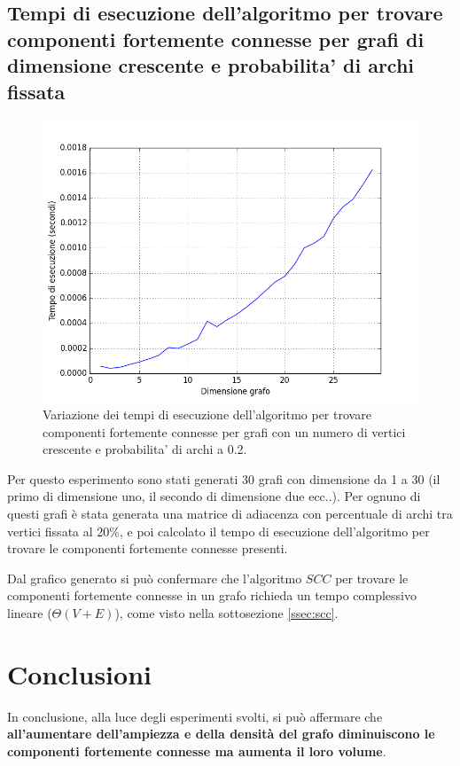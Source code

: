 \documentclass[a4paper,12pt]{article}
\begin{document}
\clearpage
\subsection{Tempi di esecuzione dell'algoritmo per trovare componenti fortemente connesse per grafi di dimensione crescente e probabilita' di archi fissata}
\begin{figure}[h]
    \centering
    \captionsetup{justification=centering,margin=1cm}
    \includegraphics[width=1.0\textwidth]{test4}
    \caption{Variazione dei tempi di esecuzione dell'algoritmo per trovare componenti fortemente connesse per grafi con un numero di vertici crescente e probabilita' di archi a 0.2.}
    \label{fig:test4}
\end{figure}

Per questo esperimento sono stati generati 30 grafi con dimensione da 1 a 30 (il primo di dimensione uno, il secondo di dimensione due ecc..). Per ognuno di questi grafi è stata generata una matrice di adiacenza con percentuale di archi tra vertici fissata al 20\%, e poi calcolato il tempo di esecuzione dell'algoritmo per trovare le componenti fortemente connesse presenti.
\newline

Dal grafico generato si può confermare che l'algoritmo $SCC$ per trovare le componenti fortemente connesse in un grafo richieda un tempo complessivo lineare ($\Theta(V +E)$), come visto nella sottosezione \ref{ssec:scc}.

\clearpage
\section{Conclusioni}\label{ssec:con}
In conclusione, alla luce degli esperimenti svolti, si può affermare che \textbf{all'aumentare dell'ampiezza e della densità del grafo diminuiscono le componenti fortemente connesse ma aumenta il loro volume}.
\newline
\end{document}
